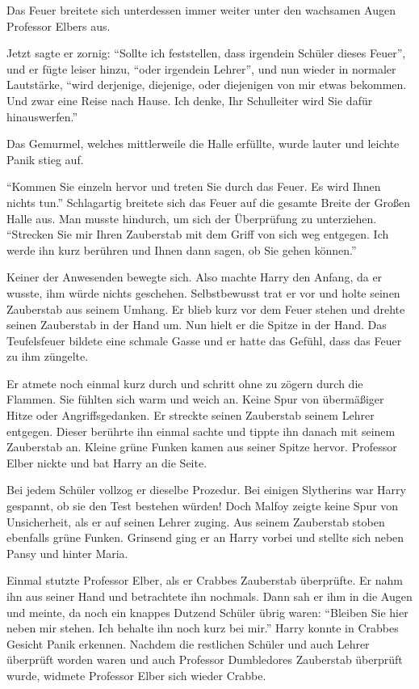 Das Feuer breitete sich unterdessen immer weiter unter den wachsamen Augen Professor Elbers aus.

Jetzt sagte er zornig: \enquote{Sollte ich feststellen, dass irgendein Schüler dieses Feuer}, und er fügte leiser hinzu, \enquote{oder irgendein Lehrer}, und nun wieder in normaler Lautstärke, \enquote{wird derjenige, diejenige, oder diejenigen von mir etwas bekommen. Und zwar eine Reise nach Hause. Ich denke, Ihr Schulleiter wird Sie dafür hinauswerfen.}

Das Gemurmel, welches mittlerweile die Halle erfüllte, wurde lauter und leichte Panik stieg auf.

\enquote{Kommen Sie einzeln hervor und treten Sie durch das Feuer. Es wird Ihnen nichts tun.} Schlagartig breitete sich das Feuer auf die gesamte Breite der Großen Halle aus. Man musste hindurch, um sich der Überprüfung zu unterziehen. \enquote{Strecken Sie mir Ihren Zauberstab mit dem Griff von sich weg entgegen. Ich werde ihn kurz berühren und Ihnen dann sagen, ob Sie gehen können.}

Keiner der Anwesenden bewegte sich. Also machte Harry den Anfang, da er wusste, ihm würde nichts geschehen. Selbstbewusst trat er vor und holte seinen Zauberstab aus seinem Umhang. Er blieb kurz vor dem Feuer stehen und drehte seinen Zauberstab in der Hand um. Nun hielt er die Spitze in der Hand. Das Teufelsfeuer bildete eine schmale Gasse und er hatte das Gefühl, dass das Feuer zu ihm züngelte.

Er atmete noch einmal kurz durch und schritt ohne zu zögern durch die Flammen. Sie fühlten sich warm und weich an. Keine Spur von übermäßiger Hitze oder Angriffsgedanken. Er streckte seinen Zauberstab seinem Lehrer entgegen. Dieser berührte ihn einmal sachte und tippte ihn danach mit seinem Zauberstab an. Kleine grüne Funken kamen aus seiner Spitze hervor. Professor Elber nickte und bat Harry an die Seite.

Bei jedem Schüler vollzog er dieselbe Prozedur. Bei einigen Slytherins war Harry gespannt, ob sie den Test bestehen würden! Doch Malfoy zeigte keine Spur von Unsicherheit, als er auf seinen Lehrer zuging. Aus seinem Zauberstab stoben ebenfalls grüne Funken. Grinsend ging er an Harry vorbei und stellte sich neben Pansy und hinter Maria.

Einmal stutzte Professor Elber, als er Crabbes Zauberstab überprüfte. Er nahm ihn aus seiner Hand und betrachtete ihn nochmals. Dann sah er ihm in die Augen und meinte, da noch ein knappes Dutzend Schüler übrig waren: \enquote{Bleiben Sie hier neben mir stehen. Ich behalte ihn noch kurz bei mir.} Harry konnte in Crabbes Gesicht Panik erkennen. Nachdem die restlichen Schüler und auch Lehrer überprüft worden waren und auch Professor Dumbledores Zauberstab überprüft wurde, widmete Professor Elber sich wieder Crabbe.

